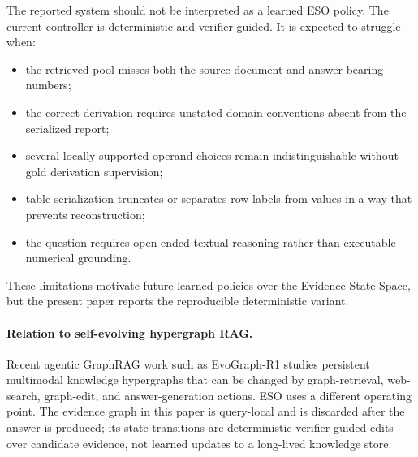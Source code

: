 The reported system should not be interpreted as a learned ESO policy.  The
current controller is deterministic and verifier-guided.  It is expected to
struggle when:
\begin{itemize}
    \item the retrieved pool misses both the source document and answer-bearing
    numbers;
    \item the correct derivation requires unstated domain conventions absent
    from the serialized report;
    \item several locally supported operand choices remain indistinguishable
    without gold derivation supervision;
    \item table serialization truncates or separates row labels from values in a
    way that prevents reconstruction;
    \item the question requires open-ended textual reasoning rather than
    executable numerical grounding.
\end{itemize}
These limitations motivate future learned policies over the Evidence State
Space, but the present paper reports the reproducible deterministic variant.

\paragraph{Relation to self-evolving hypergraph RAG.}
Recent agentic GraphRAG work such as EvoGraph-R1 studies persistent multimodal
knowledge hypergraphs that can be changed by graph-retrieval, web-search,
graph-edit, and answer-generation actions.  ESO uses a different operating
point.  The evidence graph in this paper is query-local and is discarded after
the answer is produced; its state transitions are deterministic verifier-guided
edits over candidate evidence, not learned updates to a long-lived knowledge
store.

